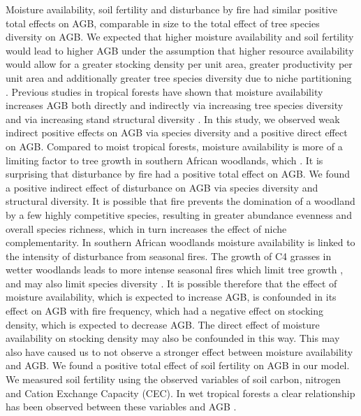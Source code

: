 \documentclass[11pt,a4paper]{article}
\begin{document}
Moisture availability, soil fertility and disturbance by fire had similar positive total effects on AGB, comparable in size to the total effect of tree species diversity on AGB. We expected that higher moisture availability and soil fertility would lead to higher AGB under the assumption that higher resource availability would allow for a greater stocking density per unit area, greater productivity per unit area and additionally greater tree species diversity due to niche partitioning \citep{Kraaij2006, Shirima2015}. Previous studies in tropical forests have shown that moisture availability increases AGB both directly and indirectly via increasing tree species diversity and via increasing stand structural diversity \citep{Ali2019a, Ali2019b, Poorter2017}. In this study, we observed weak indirect positive effects on AGB via species diversity and a positive direct effect on AGB. Compared to moist tropical forests, moisture availability is more of a limiting factor to tree growth in southern African woodlands, which . It is surprising that disturbance by fire had a positive total effect on AGB. We found a positive indirect effect of disturbance on AGB via species diversity and structural diversity. It is possible that fire prevents the domination of a woodland by a few highly competitive species, resulting in greater abundance evenness and overall species richness, which in turn increases the effect of niche complementarity. In southern African woodlands moisture availability is linked to the intensity of disturbance from seasonal fires. The growth of C4 grasses in wetter woodlands leads to more intense seasonal fires which limit tree growth \citep{Charles-Dominique2018}, and may also limit species diversity \citep{Linder2014}. It is possible therefore that the effect of moisture availability, which is expected to increase AGB, is confounded in its effect on AGB with fire frequency, which had a negative effect on stocking density, which is expected to decrease AGB. The direct effect of moisture availability on stocking density may also be confounded in this way. This may also have caused us to not observe a stronger effect between moisture availability and AGB. We found a positive total effect of soil fertility on AGB in our model. We measured soil fertility using the observed variables of soil carbon, nitrogen and Cation Exchange Capacity (CEC). In wet tropical forests a clear relationship has been observed between these variables and AGB \citep{Slik2009, Coelho-de-Souza2019}. 
\end{document}
